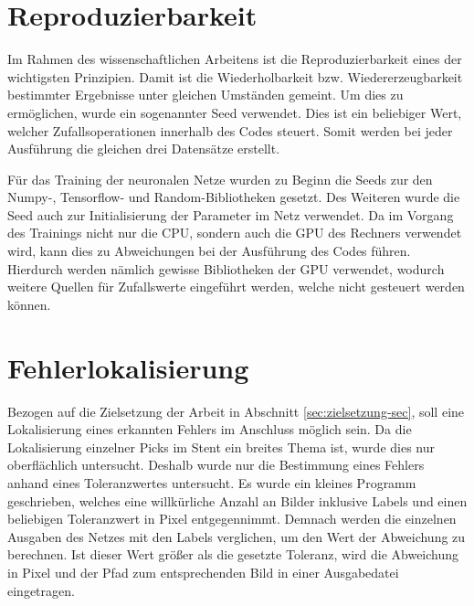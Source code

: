 \section{Reproduzierbarkeit}
Im Rahmen des wissenschaftlichen Arbeitens ist die Reproduzierbarkeit eines der wichtigsten Prinzipien. Damit ist die Wiederholbarkeit bzw. Wiedererzeugbarkeit bestimmter Ergebnisse unter gleichen Umständen gemeint. Um dies zu ermöglichen, wurde ein sogenannter Seed verwendet. Dies ist ein beliebiger Wert, welcher Zufallsoperationen innerhalb des Codes steuert. Somit werden bei jeder Ausführung die gleichen drei Datensätze erstellt.

\mypar Für das Training der neuronalen Netze wurden zu Beginn die Seeds zur den Numpy-, Tensorflow- und Random-Bibliotheken gesetzt. Des Weiteren wurde die Seed auch zur Initialisierung der Parameter im Netz verwendet. Da im Vorgang des Trainings nicht nur die CPU, sondern auch die GPU des Rechners verwendet wird, kann dies zu Abweichungen bei der Ausführung des Codes führen. Hierdurch werden nämlich gewisse Bibliotheken der GPU verwendet, wodurch weitere Quellen für Zufallswerte eingeführt werden, welche nicht gesteuert werden können.


\section{Fehlerlokalisierung}
Bezogen auf die Zielsetzung der Arbeit in Abschnitt \ref{sec:zielsetzung-sec}, soll eine Lokalisierung eines erkannten Fehlers im Anschluss möglich sein. Da die Lokalisierung einzelner Picks im Stent ein breites Thema ist, wurde dies nur oberflächlich untersucht. Deshalb wurde nur die Bestimmung eines Fehlers anhand eines Toleranzwertes untersucht. Es wurde ein kleines Programm geschrieben, welches eine willkürliche Anzahl an Bilder inklusive Labels und einen beliebigen Toleranzwert in Pixel entgegennimmt. Demnach werden die einzelnen Ausgaben des Netzes mit den Labels verglichen, um den Wert der Abweichung zu berechnen. Ist dieser Wert größer als die gesetzte Toleranz, wird die Abweichung in Pixel und der Pfad zum entsprechenden Bild in einer Ausgabedatei eingetragen. 




